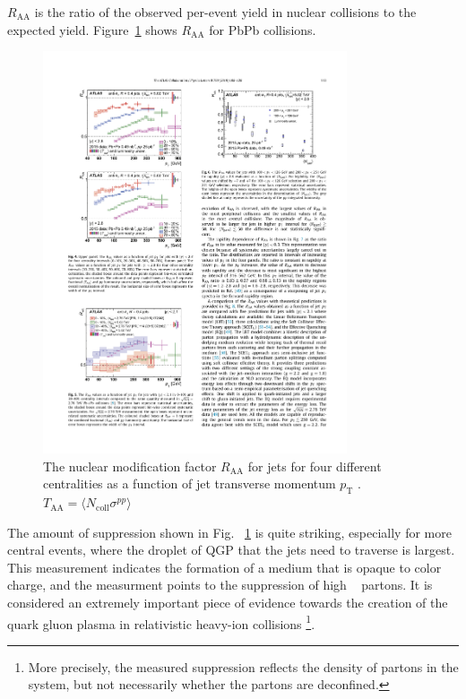   $R_\mathrm{AA}$ is the ratio of the observed per-event yield in nuclear collisions to the expected yield. Figure~\ref{fig:atlas_raa} shows $R_\mathrm{AA}$ for PbPb collisions.
  \begin{figure}[htpb]
    \centering
    \includegraphics[width=0.8\textwidth]{Introduction/atlas_raa.pdf}
    \caption{The nuclear modification factor $R_\mathrm{AA}$ for jets for four different centralities as a function of jet transverse momentum $p_\mathrm{T}$ \cite{Aaboud2019}. $T_\mathrm{AA} = \langle N_\mathrm{coll}\sigma^{pp}\rangle$}
    \label{fig:atlas_raa}
  \end{figure}
  The amount of suppression shown in Fig. ~\ref{fig:atlas_raa} is quite striking, especially for more central events, where the droplet of QGP that the jets need to traverse is largest. This measurement indicates the formation of a medium that is opaque to color charge, and the measurment points to the suppression of high \pT~ partons. It is considered an extremely important piece of evidence towards the creation of the quark gluon plasma in relativistic heavy-ion collisions \footnote{More precisely, the measured suppression reflects the density of partons in the system, but not necessarily whether the partons are deconfined.}. 

